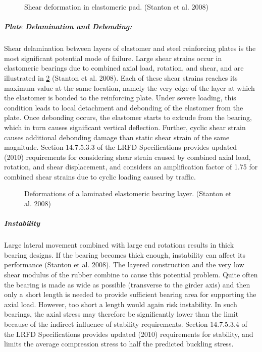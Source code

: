 \begin{figure}
  \caption{Shear deformation in elastomeric pad. (Stanton et al. 2008)}
  \label{fig:shear-deformation-elastomeric-pad}
\end{figure}


\subparagraph{Plate Delamination and Debonding:}
Shear delamination between layers of elastomer and steel reinforcing plates is the most significant potential
mode of failure. Large shear strains occur in elastomeric bearings due to combined axial load, rotation, and shear, and are illustrated in \cref{fig:deformation-elastomeric-bearing} (Stanton et al. 2008). Each of these shear strains reaches its maximum value at the
same location, namely the very edge of the layer at which the elastomer is bonded to the reinforcing plate. Under
severe loading, this condition leads to local detachment and debonding of the elastomer from the plate. Once
debonding occurs, the elastomer starts to extrude from the bearing, which in turn causes significant vertical
deflection. Further, cyclic shear strain causes additional debonding damage than static shear strain of the same
magnitude. Section 14.7.5.3.3 of the LRFD Specifications provides updated (2010) requirements for considering
shear strain caused by combined axial load, rotation, and shear displacement, and considers an amplification factor of
1.75 for combined shear strains due to cyclic loading caused by traffic.

\begin{figure}
  \caption{Deformations of a laminated elastomeric bearing layer. (Stanton et al. 2008)}
  \label{fig:deformation-elastomeric-bearing}
\end{figure}

\subparagraph{Instability}
Large lateral movement combined with large end rotations results in thick bearing designs. If the bearing
becomes thick enough, instability can affect its performance (Stanton et al. 2008). The layered construction and the
very low shear modulus of the rubber combine to cause this potential problem. Quite often the bearing is made as
wide as possible (transverse to the girder axis) and then only a short length is needed to provide sufficient bearing
area for supporting the axial load. However, too short a length would again risk instability. In such bearings, the axial
stress may therefore be significantly lower than the limit because of the indirect influence of stability requirements.
Section 14.7.5.3.4 of the LRFD Specifications provides updated (2010) requirements for stability, and limits the
average compression stress to half the predicted buckling stress.

